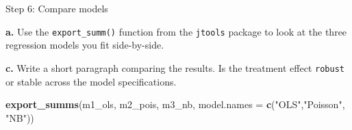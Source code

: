 \documentclass[
]{article}
\newenvironment{Shaded}{\begin{snugshade}}{\end{snugshade}}
\newcommand{\AttributeTok}[1]{\textcolor[rgb]{0.13,0.29,0.53}{#1}}
\newcommand{\FunctionTok}[1]{\textcolor[rgb]{0.13,0.29,0.53}{\textbf{#1}}}
\newcommand{\NormalTok}[1]{#1}
\newcommand{\StringTok}[1]{\textcolor[rgb]{0.31,0.60,0.02}{#1}}
\begin{document}
Step 6: Compare models

\textbf{a.} Use the \texttt{export\_summ()} function from the
\texttt{jtools} package to look at the three regression models you fit
side-by-side.

\textbf{c.} Write a short paragraph comparing the results. Is the
treatment effect \texttt{robust} or stable across the model
specifications.

\begin{Shaded}
\begin{Highlighting}[]
\FunctionTok{export\_summs}\NormalTok{(m1\_ols, m2\_pois, m3\_nb,}
             \AttributeTok{model.names =} \FunctionTok{c}\NormalTok{(}\StringTok{"OLS"}\NormalTok{,}\StringTok{"Poisson"}\NormalTok{, }\StringTok{"NB"}\NormalTok{))}
\end{Highlighting}
\end{Shaded}

 
  \providecommand{\huxb}[2]{\arrayrulecolor[RGB]{#1}\global\arrayrulewidth=#2pt}
  \providecommand{\huxvb}[2]{\color[RGB]{#1}\vrule width #2pt}
  \providecommand{\huxtpad}[1]{\rule{0pt}{#1}}
  \providecommand{\huxbpad}[1]{\rule[-#1]{0pt}{#1}}
\end{document}
